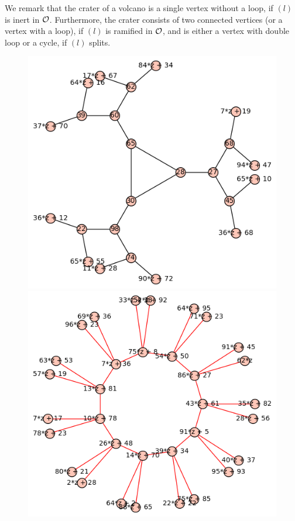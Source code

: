 We remark that the crater of a volcano is a single vertex without a loop, if $(l)$ is inert in $\mathcal{O}$.
Furthermore, the crater consists of two connected vertices (or a vertex with a loop), if $(l)$ is ramified in $\mathcal{O}$, and is either a vertex with double loop or a cycle, if $(l)$ splits.
\begin{figure}
    \begin{minipage}{0.5\textwidth}
        \includegraphics[width = \textwidth]{../example_odd_crater_fp.png}
    \end{minipage}%
    \begin{minipage}{0.5\textwidth}
        \includegraphics[width = \textwidth]{../example_odd_crater.png}

\end{minipage}
\end{figure}
